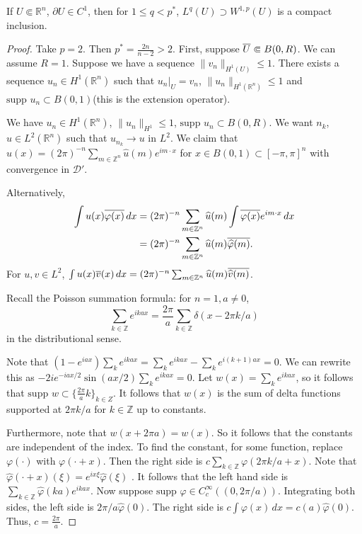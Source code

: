 \documentclass[12pt]{scrartcl}
\newcommand{\Z}{\mathbb{Z}}
\newcommand{\R}{\mathbb{R}}
\renewcommand{\hat}{\widehat}
\newcommand{\<}{\langle}
\renewcommand{\>}{\rangle}
\let \phi \varphi
\let \mc \mathcal
\newcommand{\supp}{\text{supp }}
\begin{document}
\begin{thm} If $U \Subset \R^n$, $\partial U \in C^1$, then for $1 \le q < p^*$, $L^q(U) \supset W^{1, p}(U)$ is a compact inclusion.
\end{thm}
\begin{proof}
Take $p = 2$.  Then $p^* = \frac{2n}{n-2} > 2$.  First, suppose $\overline{U} \Subset B(0, R)$.  We can assume $R = 1$.  Suppose we have a sequence $\|v_n\|_{H^1(U)} \le 1$.  There exists a sequence $u_n \in H^1(\R^n)$ such that $u_n\vert_U = v_n$, $\|u_n\|_{H^1(\R^n)} \le 1$ and $\supp u_n \subset B(0, 1)$(this is the extension operator).

We have $u_n \in H^1(\R^n)$, $\|u_n\|_{H^1} \le 1$, $\supp u_n \subset B(0, R)$.  We want $n_k$, $u \in L^2(\R^n)$ such that $u_{n_k} \to u$ in $L^2$.  We claim that $u(x) = (2\pi)^{-n} \sum_{m \in \Z^n} \hat{u}(m) e^{im\cdot x}$ for $x\in B(0, 1) \subset [-\pi, \pi]^n$ with convergence in $\mc D'$.

Alternatively,
\begin{align*}
\int u(x) \ol{\phi(x)}\,dx &= (2\pi)^{-n}\sum_{m \in \Z^n} \hat{u}(m) \int \ol{\phi(x)} e^{im\cdot x}\,dx\\
&= (2\pi)^{-n} \sum_{m \in \Z^n} \hat{u}(m) \ol{\hat{\phi}(m)}.
\end{align*}
For $u, v\in L^2$, $\int u(x)\ol{v}(x)\,dx = (2\pi)^{-n} \sum_{m \in \Z^n} \hat{u}(m) \ol{\hat{v}(m)}$.

Recall the Poisson summation formula: for $n = 1, a \ne 0$, $$\sum_{k \in \Z} e^{ikax} = \frac{2\pi}{a}\sum_{k \in \Z} \delta(x - 2\pi k/a)$$
in the distributional sense.

Note that $(1 - e^{iax}) \sum_k e^{ikax} = \sum_{k} e^{ikax} - \sum_{k} e^{i(k+1) ax} = 0$.  We can rewrite this as $-2ie^{-iax/2} \sin{(ax/2)} \sum_k e^{ikax} = 0$.  Let $w(x) = \sum_{k} e^{ikax}$, so it follows that $\supp w \subset \{\frac{2\pi}{a}k\}_{k \in Z}$.  It follows that $w(x)$ is the sum of delta functions supported at $2\pi k/a$ for $k \in \Z$ up to constants.  

Furthermore, note that $w(x + 2\pi a) = w(x)$.  So it follows that the constants are independent of the index.  To find the constant, for some function, replace $\phi(\cdot)$ with $\phi(\cdot + x)$.  Then the right side is $c \sum_{k \in \Z} \phi(2\pi k/a + x)$.  Note that $\hat{\phi}(\cdot + x)(\xi) = e^{ix \xi} \hat{\phi}(\xi)$ .  It follows that the left hand side is $\sum_{k \in \Z} \hat{\phi}(ka) e^{ikax}$.  Now suppose $\supp \phi \in C_c^\infty((0, 2\pi/a))$.    Integrating both sides, the left side is $2\pi/a \hat{\phi}(0)$.  The right side is $c \int \phi(x)\,dx = c(a) \hat{\phi}(0)$.  Thus, $c = \frac{2\pi}{a}$.


\end{proof}
\end{document}
